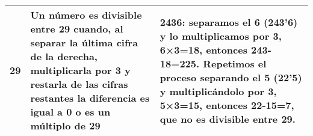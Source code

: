 \begin{center}
{\begin{xtabular}{|L{.1\columnwidth}|C{.4\columnwidth}|L{.4\columnwidth}|}
    29 & Un número es divisible entre 29 cuando, al separar la última cifra de la derecha, multiplicarla por 3 y restarla de las cifras restantes la diferencia es igual a 0 o es un múltiplo de 29 & 2436: separamos el 6 (243'6) y lo multiplicamos por 3, 6×3=18, entonces 243-18=225. Repetimos el proceso separando el 5 (22'5) y multiplicándolo por 3, 5×3=15, entonces 22-15=7, que no es divisible entre 29. \\ \hline
  \end{xtabular}
}
\end{center}
